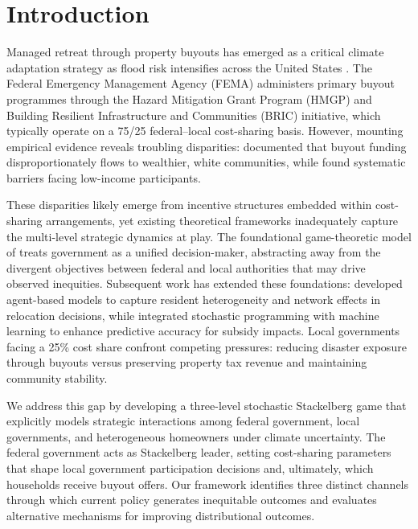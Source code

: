 \documentclass[preprint,12pt,authoryear]{elsarticle}
\begin{document}
\section{Introduction}\label{sec:intro}

Managed retreat through property buyouts has emerged as a critical climate adaptation strategy as flood risk intensifies across the United States \citep{siders2019strategic, mach2019managed}. The Federal Emergency Management Agency (FEMA) administers primary buyout programmes through the Hazard Mitigation Grant Program (HMGP) and Building Resilient Infrastructure and Communities (BRIC) initiative, which typically operate on a 75/25 federal--local cost-sharing basis. However, mounting empirical evidence reveals troubling disparities: \citet{elliott2021racial} documented that buyout funding disproportionately flows to wealthier, white communities, while \citet{greer2017historical} found systematic barriers facing low-income participants.

These disparities likely emerge from incentive structures embedded within cost-sharing arrangements, yet existing theoretical frameworks inadequately capture the multi-level strategic dynamics at play. The foundational game-theoretic model of \citet{bier2019game} treats government as a unified decision-maker, abstracting away from the divergent objectives between federal and local authorities that may drive observed inequities. Subsequent work has extended these foundations: \citet{zhou2022predisaster} developed agent-based models to capture resident heterogeneity and network effects in relocation decisions, while \citet{zhou2025stochastic} integrated stochastic programming with machine learning to enhance predictive accuracy for subsidy impacts. Local governments facing a 25\% cost share confront competing pressures: reducing disaster exposure through buyouts versus preserving property tax revenue and maintaining community stability.

We address this gap by developing a three-level stochastic Stackelberg game that explicitly models strategic interactions among federal government, local governments, and heterogeneous homeowners under climate uncertainty. The federal government acts as Stackelberg leader, setting cost-sharing parameters that shape local government participation decisions and, ultimately, which households receive buyout offers. Our framework identifies three distinct channels through which current policy generates inequitable outcomes and evaluates alternative mechanisms for improving distributional outcomes.
\end{document}
